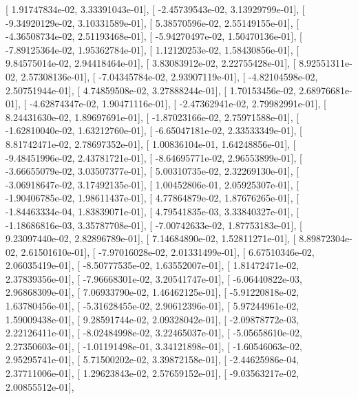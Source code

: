 \documentclass{article}
\begin{document}
       [  1.91747834e-02,   3.33391043e-01],
       [ -2.45739543e-02,   3.13929799e-01],
       [ -9.34920129e-02,   3.10331589e-01],
       [  5.38570596e-02,   2.55149155e-01],
       [ -4.36508734e-02,   2.51193468e-01],
       [ -5.94270497e-02,   1.50470136e-01],
       [ -7.89125364e-02,   1.95362784e-01],
       [  1.12120253e-02,   1.58430856e-01],
       [  9.84575014e-02,   2.94418464e-01],
       [  3.83083912e-02,   2.22755428e-01],
       [  8.92551311e-02,   2.57308136e-01],
       [ -7.04345784e-02,   2.93907119e-01],
       [ -4.82104598e-02,   2.50751944e-01],
       [  4.74859508e-02,   3.27888244e-01],
       [  1.70153456e-02,   2.68976681e-01],
       [ -4.62874347e-02,   1.90471116e-01],
       [ -2.47362941e-02,   2.79982991e-01],
       [  8.24431630e-02,   1.89697691e-01],
       [ -1.87023166e-02,   2.75971588e-01],
       [ -1.62810040e-02,   1.63212760e-01],
       [ -6.65047181e-02,   2.33533349e-01],
       [  8.81742471e-02,   2.78697352e-01],
       [  1.00836104e-01,   1.64248856e-01],
       [ -9.48451996e-02,   2.43781721e-01],
       [ -8.64695771e-02,   2.96553899e-01],
       [ -3.66655079e-02,   3.03507377e-01],
       [  5.00310735e-02,   2.32269130e-01],
       [ -3.06918647e-02,   3.17492135e-01],
       [  1.00452806e-01,   2.05925307e-01],
       [ -1.90406785e-02,   1.98611437e-01],
       [  4.77864879e-02,   1.87676265e-01],
       [ -1.84463334e-04,   1.83839071e-01],
       [  4.79541835e-03,   3.33840327e-01],
       [ -1.18686816e-03,   3.35787708e-01],
       [ -7.00742633e-02,   1.87753183e-01],
       [  9.23097440e-02,   2.82896789e-01],
       [  7.14684890e-02,   1.52811271e-01],
       [  8.89872304e-02,   2.61501610e-01],
       [ -7.97016028e-02,   2.01331499e-01],
       [  6.67510346e-02,   2.06035419e-01],
       [ -8.50777535e-02,   1.63552007e-01],
       [  1.81472471e-02,   2.37839356e-01],
       [ -7.96668301e-02,   3.20541747e-01],
       [ -6.06440822e-03,   2.96868309e-01],
       [  7.06933790e-02,   1.46462125e-01],
       [ -5.91220818e-02,   1.63780456e-01],
       [ -5.31628455e-02,   2.90612396e-01],
       [  5.97244961e-02,   1.59009438e-01],
       [  9.28591744e-02,   2.09328042e-01],
       [ -2.09878772e-03,   2.22126411e-01],
       [ -8.02484998e-02,   3.22465037e-01],
       [ -5.05658610e-02,   2.27350603e-01],
       [ -1.01191498e-01,   3.34121898e-01],
       [ -1.60546063e-02,   2.95295741e-01],
       [  5.71500202e-02,   3.39872158e-01],
       [ -2.44625986e-04,   2.37711006e-01],
       [  1.29623843e-02,   2.57659152e-01],
       [ -9.03563217e-02,   2.00855512e-01],
\end{document}
